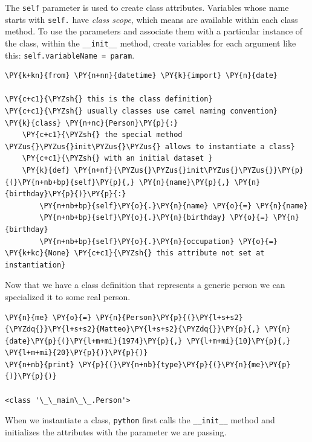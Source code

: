 The \texttt{self} parameter is used to create class attributes. Variables
whose name starts with \texttt{self.} have \emph{class scope}, which means are
available within each class method. To use the parameters and
associate them with a particular instance of the class, within the
\texttt{\_\_init\_\_} method, create variables for each argument like
this: \texttt{self.variableName\ =\ param}.

\begin{codebox}
\begin{Verbatim}[commandchars=\\\{\}]
\PY{k+kn}{from} \PY{n+nn}{datetime} \PY{k}{import} \PY{n}{date}

\PY{c+c1}{\PYZsh{} this is the class definition}
\PY{c+c1}{\PYZsh{} usually classes use camel naming convention}
\PY{k}{class} \PY{n+nc}{Person}\PY{p}{:}
    \PY{c+c1}{\PYZsh{} the special method \PYZus{}\PYZus{}init\PYZus{}\PYZus{} allows to instantiate a class}
    \PY{c+c1}{\PYZsh{} with an initial dataset }
    \PY{k}{def} \PY{n+nf}{\PYZus{}\PYZus{}init\PYZus{}\PYZus{}}\PY{p}{(}\PY{n+nb+bp}{self}\PY{p}{,} \PY{n}{name}\PY{p}{,} \PY{n}{birthday}\PY{p}{)}\PY{p}{:}
        \PY{n+nb+bp}{self}\PY{o}{.}\PY{n}{name} \PY{o}{=} \PY{n}{name}
        \PY{n+nb+bp}{self}\PY{o}{.}\PY{n}{birthday} \PY{o}{=} \PY{n}{birthday}     
        \PY{n+nb+bp}{self}\PY{o}{.}\PY{n}{occupation} \PY{o}{=} \PY{k+kc}{None} \PY{c+c1}{\PYZsh{} this attribute not set at instantiation}
\end{Verbatim}
\end{codebox}

Now that we have a class definition that represents a generic person we can 
specialized it to some real person.

\begin{codebox}
\begin{Verbatim}[commandchars=\\\{\}]
\PY{n}{me} \PY{o}{=} \PY{n}{Person}\PY{p}{(}\PY{l+s+s2}{\PYZdq{}}\PY{l+s+s2}{Matteo}\PY{l+s+s2}{\PYZdq{}}\PY{p}{,} \PY{n}{date}\PY{p}{(}\PY{l+m+mi}{1974}\PY{p}{,} \PY{l+m+mi}{10}\PY{p}{,} \PY{l+m+mi}{20}\PY{p}{)}\PY{p}{)}
\PY{n+nb}{print} \PY{p}{(}\PY{n+nb}{type}\PY{p}{(}\PY{n}{me}\PY{p}{)}\PY{p}{)}

<class '\_\_main\_\_.Person'>
\end{Verbatim}
\end{codebox}

When we instantiate a class, \texttt{python} first calls the
\texttt{\_\_init\_\_} method and initializes the attributes with
the parameter we are passing.

